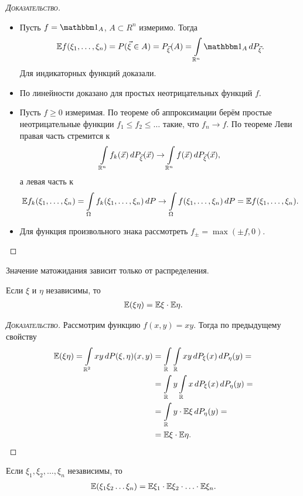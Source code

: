 \documentclass[../main.tex]{subfiles}
\begin{document}
\begin{proof}[\normalfont\textsc{Доказательство}]\
 \begin{itemize}
  \item Пусть $ f = \Ind_A $, $ A \subset R^{n} $ измеримо. Тогда
   \begin{align*}
    \E f (\xi_1, \ldots, \xi_n) = P(\vec\xi \in A) = P_{\vec\xi}(A) = \int\limits_{\R^{n}} \Ind_A\,dP_{\vec\xi}.
   \end{align*}  Для индикаторных функций доказали.
  \item По линейности доказано для простых неотрицательных функций $ f $.
  \item Пусть $ f \geqslant 0 $ измеримая. По теореме об аппроксимации берём простые неотрицательные функции $ f_1 \leqslant f_2 \leqslant \ldots $ такие, что $ f_n \to f $. По теореме Леви правая часть стремится к
   \begin{align*}
    \int\limits_{\mathbb{R}^{n}} f_k(\vec x)  \,dP_{\vec\xi}(\vec x) \to \int\limits_{\mathbb{R}^{n}} f(\vec x)\,dP_{\vec\xi} (\vec x),
   \end{align*} а левая часть к
   \begin{align*}
    \mathbb E f_k (\xi_1, \ldots, \xi_n) = \int\limits_{\Omega} f_k(\xi_1, \ldots, \xi_n) \,dP \to \int\limits_{\Omega} f(\xi_1, \ldots, \xi_n)\,dP = \mathbb E f(\xi_1, \ldots, \xi_n).
   \end{align*} 
  \item Для функция произвольного знака рассмотреть $ f_\pm = \max(\pm f, 0) $.
 \end{itemize}
\end{proof}
\begin{crly*}
 Значение матожидания зависит только от распределения.
\end{crly*}
\begin{prop}
 \label{proposition:independent_expected_product}
 Если $ \xi $ и $ \eta $ независимы, то
 \begin{align*}
  \mathbb E(\xi \eta) = \mathbb E\xi \cdot \mathbb E\eta.
 \end{align*} 
\end{prop}
\begin{proof}[\normalfont\textsc{Доказательство}]
 Рассмотрим функцию $ f(x,y) = xy $. Тогда по предыдущему свойству
 \begin{align*}
  \mathbb E(\xi\eta) = \int\limits_{\mathbb{R}^{2}} xy \,dP{(\xi,\eta)} (x,y) &= \int\limits_{\mathbb{R}} \int\limits_{\mathbb{R}} xy\,dP_{\xi}(x)\,dP_{\eta}(y) = \\
  &= \int\limits_{\mathbb{R}} y \int\limits_{\mathbb{R}} x\,dP_{\xi}(x)\,dP_{\eta}(y) = \\
  &= \int\limits_{\mathbb{R}} y \cdot \mathbb E\xi\,dP_{\eta}(y) = \\
  &= \mathbb E\xi \cdot \mathbb E\eta.
 \end{align*} 
\end{proof}
\begin{prop*}
 Если $ \xi_1,\xi_2, \ldots, \xi_n $ независимы, то
 \begin{align*}
  \mathbb E(\xi_1 \xi_2 \ldots \xi_n) = \mathbb E\xi_1 \cdot \mathbb E\xi_2 \cdot \ldots \cdot \mathbb E\xi_n.
 \end{align*} 
\end{prop*}
\end{document}
